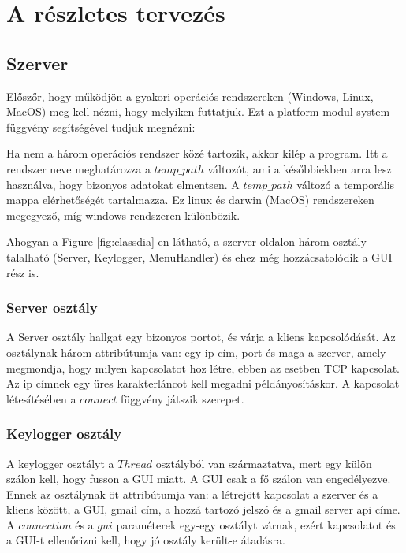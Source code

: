 \documentclass[a4paper, 11pt]{article}
\begin{document}
\section{A részletes tervezés}\label{sec:plan}

\subsection{Szerver}\label{subsec:server}
Előszőr, hogy működjön a gyakori operációs rendszereken (Windows, Linux, MacOS) meg kell nézni, hogy melyiken futtatjuk. Ezt a platform modul system függvény segítségével tudjuk megnézni:



\noindent Ha nem a három operációs rendszer közé tartozik, akkor kilép a program. Itt a rendszer neve meghatározza a $temp\_path$ változót, ami a későbbiekben arra lesz használva, hogy bizonyos adatokat elmentsen. A $temp\_path$ változó a temporális mappa elérhetőségét tartalmazza. Ez linux és darwin (MacOS) rendszereken megegyező, míg windows rendszeren különbözik.

Ahogyan a Figure \ref{fig:classdia}-en látható, a szerver oldalon három osztály talalható (Server, Keylogger, MenuHandler) és ehez még hozzácsatolódik a GUI rész is.

\subsubsection{Server osztály}\label{subsubsec:serverclass}
A Server osztály hallgat egy bizonyos portot, és várja a kliens kapcsolódását. Az osztálynak három attribútumja van: egy ip cím, port és maga a szerver, amely megmondja, hogy milyen kapcsolatot hoz létre, ebben az esetben TCP kapcsolat. Az ip címnek egy üres karakterláncot kell megadni példányosításkor. A kapcsolat létesítésében a $connect$ függvény játszik szerepet.

\subsubsection{Keylogger osztály}\label{subsubsec:keyloggerclass}
A keylogger osztályt a $Thread$ osztályból van származtatva, mert egy külön szálon kell, hogy fusson a GUI miatt. A GUI csak a fő szálon van engedélyezve. Ennek az osztálynak öt attribútumja van: a létrejött kapcsolat a szerver és a kliens között, a GUI, gmail cím, a hozzá tartozó jelszó és a gmail server api címe. A $connection$ és a $gui$ paraméterek egy-egy osztályt várnak, ezért kapcsolatot és a GUI-t ellenőrizni kell, hogy jó osztály került-e átadásra.
\end{document}
